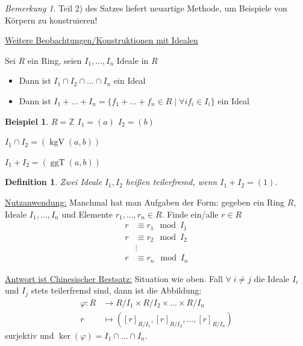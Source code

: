 \documentclass[a4paper,12pt,numbers=noenddot,parskip=full]{scrartcl}
\newcommand{\setZ}{\mathbb{Z}}
\newcommand{\heading}{\underline}
\theoremstyle{dotless}
\newtheorem{definition}[theorem]{Definition}
\newtheorem{example}[theorem]{Beispiel}
\theoremstyle{remark}
\newtheorem*{remark}{Bemerkung}
\begin{document}
	\begin{remark}
		Teil 2) des Satzes liefert neuartige Methode, um Beispiele von Körpern zu konstruieren!
	\end{remark}

	\heading{Weitere Beobachtungen/Konstruktionen mit Idealen}
	
	Sei $R$ ein Ring, seien $I_1, \dots, I_n$ Ideale in $R$
	\begin{itemize}
		\item Dann ist $I_1 \cap I_2 \cap \dots \cap I_n$ ein Ideal
		\item Dann ist $I_1 + \dots + I_n = \{ f_1 + \dots + f_n \in R \mid \forall i f_i \in I_i \}$ ein Ideal
	\end{itemize}

	\begin{example}
		$R = \setZ$ $I_1 = (a)$ $I_2 = (b)$
		
		$I_1 \cap I_2 = (\operatorname{kgV}(a,b))$
		
		$I_1 + I_2 = (\operatorname{ggT}(a,b))$
	\end{example}

	\begin{definition}
		Zwei Ideale $I_1, I_2$ heißen teilerfremd, wenn $I_1 + I_2 = (1)$.
	\end{definition}

	\heading{Nutzanwendung:} Manchmal hat man Aufgaben der Form: gegeben ein Ring $R$, Ideale $I_1, \dots, I_n$ und Elemente $r_1, \dots, r_n \in R$. Finde ein/alle $r \in R$
	\begin{align*}
		r &\equiv r_1 \mod I_1 \\
		r &\equiv r_2 \mod I_2 \\
		&\vdots \\
		r &\equiv r_n \mod I_n
	\end{align*}
	
	\heading{Antwort ist Chinesischer Restsatz:} Situation wie oben. Fall $\forall \; i \neq j$ die Ideale $I_i$ und $I_j$ stets teilerfremd sind, dann ist die Abbildung:
	\begin{align*}
		\varphi: R &\to R/I_1 \times R/I_2 \times \dots \times R/I_n \\
		r &\mapsto ([r]_{R/I_1}, [r]_{R/I_2}, \dots, [r]_{R/I_n})
	\end{align*}
	surjektiv und $\ker(\varphi) = I_1 \cap \dots \cap I_n$.
	
\end{document}
